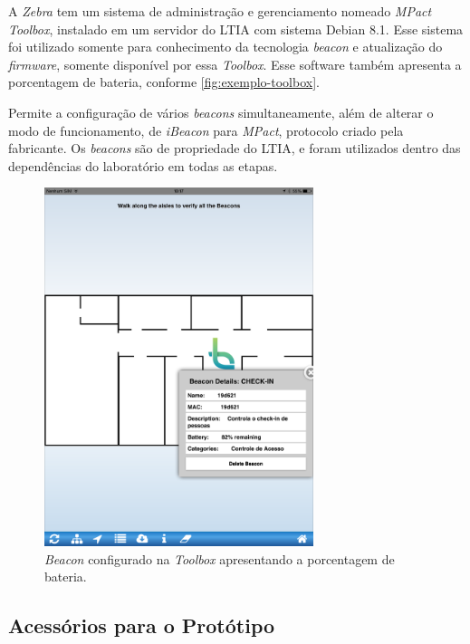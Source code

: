 \documentclass[
		12pt,				%
		openright,			%
		oneside,			%
		a4paper,			%
		chapter=TITLE,		%
		english,			%
		brazil				%
	]{abntex2}
\begin{document}
A \textit{Zebra} tem um sistema de administração e gerenciamento nomeado \textit{MPact Toolbox}, instalado em um servidor do LTIA com sistema Debian 8.1. Esse sistema foi utilizado somente para conhecimento da tecnologia \textit{beacon} e atualização do \textit{firmware}, somente disponível por essa \textit{Toolbox}. Esse software também apresenta a porcentagem de bateria, conforme \autoref{fig:exemplo-toolbox}. 

Permite a configuração de vários \textit{beacons} simultaneamente, além de alterar o modo de funcionamento, de \textit{iBeacon} para \textit{MPact}, protocolo criado pela fabricante. Os \textit{beacons} são de propriedade do LTIA, e foram utilizados dentro das dependências do laboratório em todas as etapas.

\begin{figure}[htb]
	\caption{\label{fig:exemplo-toolbox}\textit{Beacon} configurado na \textit{Toolbox} apresentando a porcentagem de bateria.}
	\begin{center}
		\includegraphics[width=0.7\textwidth]{img/toolbox-exemplo.png}
	\end{center}
\end{figure}

\subsection{Acessórios para o Protótipo}\label{sec:acess-prototipo}
\end{document}
